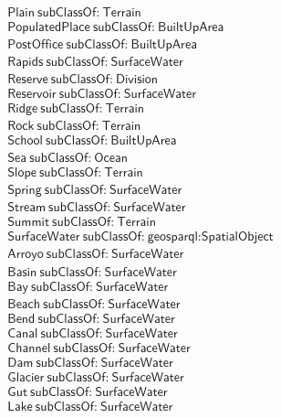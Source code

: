 \begin{align}
  \textsf{Plain}~\textsf{subClassOf:}~\textsf{Terrain}\\
  \textsf{PopulatedPlace}~\textsf{subClassOf:}~\textsf{BuiltUpArea}\\
  \textsf{PostOffice}~\textsf{subClassOf:}~\textsf{BuiltUpArea}\\
  \textsf{Rapids}~\textsf{subClassOf:}~\textsf{SurfaceWater}\\
  \textsf{Reserve}~\textsf{subClassOf:}~\textsf{Division}\\
  \textsf{Reservoir}~\textsf{subClassOf:}~\textsf{SurfaceWater}\\
  \textsf{Ridge}~\textsf{subClassOf:}~\textsf{Terrain}\\
  \textsf{Rock}~\textsf{subClassOf:}~\textsf{Terrain}\\
  \textsf{School}~\textsf{subClassOf:}~\textsf{BuiltUpArea}\\
  \textsf{Sea}~\textsf{subClassOf:}~\textsf{Ocean}\\
  \textsf{Slope}~\textsf{subClassOf:}~\textsf{Terrain}\\
  \textsf{Spring}~\textsf{subClassOf:}~\textsf{SurfaceWater}\\
  \textsf{Stream}~\textsf{subClassOf:}~\textsf{SurfaceWater}\\
  \textsf{Summit}~\textsf{subClassOf:}~\textsf{Terrain}\\
  \textsf{SurfaceWater}~\textsf{subClassOf:}~\textsf{geosparql:SpatialObject}\\
  \textsf{Arroyo}~\textsf{subClassOf:}~\textsf{SurfaceWater}\\
  \textsf{Basin}~\textsf{subClassOf:}~\textsf{SurfaceWater}\\
  \textsf{Bay}~\textsf{subClassOf:}~\textsf{SurfaceWater}\\
  \textsf{Beach}~\textsf{subClassOf:}~\textsf{SurfaceWater}\\
  \textsf{Bend}~\textsf{subClassOf:}~\textsf{SurfaceWater}\\
  \textsf{Canal}~\textsf{subClassOf:}~\textsf{SurfaceWater}\\
  \textsf{Channel}~\textsf{subClassOf:}~\textsf{SurfaceWater}\\
  \textsf{Dam}~\textsf{subClassOf:}~\textsf{SurfaceWater}\\
  \textsf{Glacier}~\textsf{subClassOf:}~\textsf{SurfaceWater}\\
  \textsf{Gut}~\textsf{subClassOf:}~\textsf{SurfaceWater}\\
  \textsf{Lake}~\textsf{subClassOf:}~\textsf{SurfaceWater}\\

\end{align}
